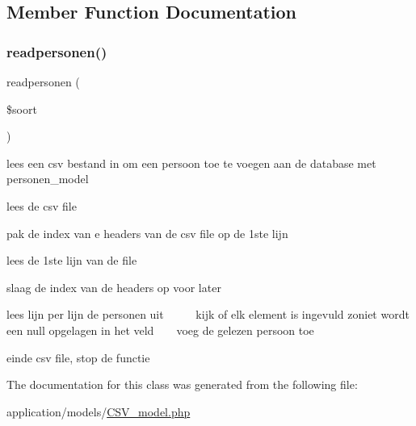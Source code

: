 \subsection{Member Function Documentation}
\mbox{\label{classcsv__model_a0982b277c56508192bc564cd095e9541}} 
\subsubsection{\texorpdfstring{readpersonen()}{readpersonen()}}
{\footnotesize\ttfamily readpersonen (\begin{DoxyParamCaption}\item[{}]{\$soort }\end{DoxyParamCaption})}



lees een csv bestand in om een persoon toe te voegen aan de database met personen\+\_\+model 

lees de csv file

pak de index van e headers van de csv file op de 1ste lijn

lees de 1ste lijn van de file

slaag de index van de headers op voor later

lees lijn per lijn de personen uit ~\newline
~\newline
~\newline
 kijk of elk element is ingevuld zoniet wordt een null opgelagen in het veld ~\newline
~\newline
 voeg de gelezen persoon toe

einde csv file, stop de functie 

The documentation for this class was generated from the following file\+:\begin{DoxyCompactItemize}
\item 
application/models/\mbox{\hyperlink{_c_s_v__model_8php}{C\+S\+V\+\_\+model.\+php}}\end{DoxyCompactItemize}
